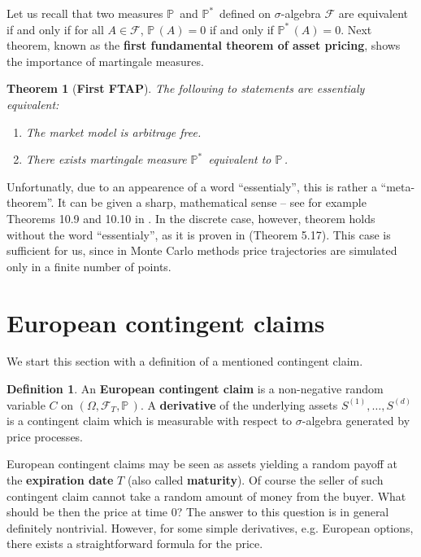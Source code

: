 \documentclass[a4paper,11pt, twoside]{book}
\newtheorem{thm}{Theorem}[chapter]
\theoremstyle{definition}
\newtheorem{mydef}{Definition}[chapter]
\theoremstyle{remark}
\def\P{{\mathbb{P}}\,}
\def\Pm{{\mathbb{P}}^*\,}
\begin{document}
Let us recall that two measures $\P$ and $\Pm$ defined on $\sigma$-algebra $\mathcal{F}$ are equivalent if and only if for all $A \in \mathcal{F}$, $\P(A)=0$ if and only if $\Pm(A)=0$. Next theorem, known as the \textbf{first fundamental theorem of asset pricing}, shows the importance of martingale measures.
\begin{thm}[\bfseries First FTAP]
 \label{thm:fftap}
 The following to statements are \emph{essentialy} equivalent:
 \begin{enumerate}
  \item The market model is arbitrage free.
  \item There exists martingale measure $\Pm$ equivalent to $\P$.
 \end{enumerate}
\end{thm}
Unfortunatly, due to an appearence of a word ``essentialy'', this is rather a ``meta-theorem''. It can be given a sharp, mathematical sense -- see for example Theorems 10.9 and 10.10 in \cite{bjork}. In the discrete case, however, theorem holds without the word ``essentialy'', as it is proven in \cite{follmer} (Theorem 5.17). This case is sufficient for us, since in Monte Carlo methods price trajectories are simulated only in a finite number of points.

\section{European contingent claims}
\label{sec:ECC}
We start this section with a definition of a mentioned contingent claim.
\begin{mydef}
 \label{def:cc_eu}
 An \textbf{European contingent claim} is a non-negative random variable $C$ on $(\Omega, \mathcal{F}_T, \P)$. A \textbf{derivative} of the underlying assets $S^{(1)}, \ldots, S^{(d)}$ is a contingent claim which is measurable with respect to $\sigma$-algebra generated by price processes.
\end{mydef}
European contingent claims may be seen as assets yielding a random payoff at the \textbf{expiration date} $T$ (also called \textbf{maturity}). Of course the seller of such contingent claim cannot take a random amount of money from the buyer. What should be then the price at time $0$? The answer to this question is in general definitely nontrivial. However, for some simple derivatives, e.g. European options, there exists a straightforward formula for the price.
\end{document}
